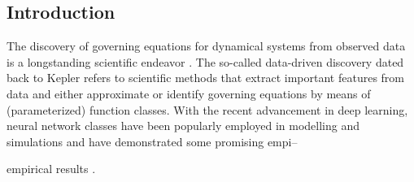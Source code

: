 \documentclass[openacc]{rsproca_new}%
\newcommand{\z}{\bm{z}}
\begin{document}
\begin{fmtext}
\section{Introduction}
The discovery of governing equations for dynamical systems 
from observed data is a longstanding scientific endeavor \cite{bongard2007automated,brunton2016discovering,schmidt2009distilling}. 
The so-called data-driven discovery dated back to Kepler
refers to scientific methods that extract important features from data 
and either approximate or identify governing equations by means of (parameterized) function classes.
With the recent advancement in deep learning,
neural network classes have been popularly employed in modelling and simulations
and have demonstrated some promising empi--
\end{fmtext}
\maketitle
\noindent 
empirical results 
\cite{chang2017reversible, weinan2017proposal, haber2017stable, lu2018beyond, qin2019data, raissi2018multistep}.
\end{document}
